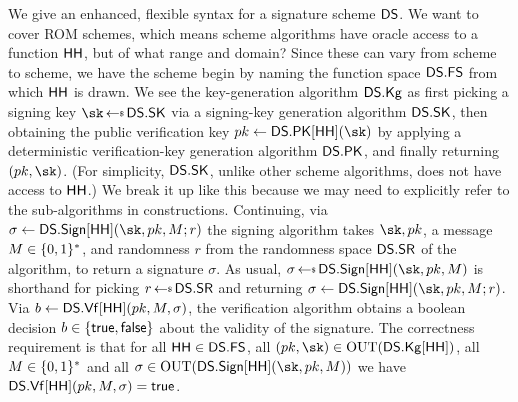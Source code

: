  We give an enhanced, flexible syntax for a signature scheme $\mathsf{DS}$. We want to cover ROM schemes, which means scheme algorithms have oracle access to a function $\mathsf{HH}$, but of what range and domain? Since these can vary from scheme to scheme, we have the scheme begin by naming the function space $\mathsf{DS}.\mathsf{FS}$ from which $\mathsf{HH}$ is drawn. We see the key-generation algorithm $\mathsf{DS}.\mathsf{Kg}$ as first picking a signing key $\sk\getsr\DS.\MakeSK$ via a signing-key generation algorithm $\mathsf{DS}.\mathsf{SK}$, then obtaining the public verification key $\pk \gets \DS.\MakePK[\HH](\sk)$ by applying a deterministic verification-key generation algorithm $\mathsf{DS}.\mathsf{PK}$, and finally returning $(\pk,\sk)$. (For simplicity, $\mathsf{DS}.\mathsf{SK}$, unlike other scheme algorithms, does not have access to $\mathsf{HH}$.) We break it up like this because we may need to explicitly refer to the sub-algorithms in constructions. Continuing, via $\sigma\gets \DS.\Sign[\HH](\sk,\pk,\msg;r)$ the signing algorithm takes $\sk,\pk$, a message ${M} \in \{0,1\}^*$, and randomness $r$ from the randomness space $\mathsf{DS}.\mathsf{SR}$ of the algorithm, to return a signature $\sigma$. As usual, $\sigma\getsr \DS.\Sign[\HH](\sk,\pk,\msg)$ is shorthand for picking $r\getsr\DS.\SigCoins$ and returning $\sigma\gets \DS.\Sign[\HH](\sk,\pk,\msg;r)$. Via $b\gets \mathsf{DS}.\mathsf{Vf}[\mathsf{HH}](pk,{M},\sigma)$, the verification algorithm obtains a boolean decision $b \in \{\mathsf{true}, \mathsf{false}\}$ about the validity of the signature. The correctness requirement is that for all $\mathsf{HH} \in \mathsf{DS}.\mathsf{FS}$, all $(\pk, \sk) \in \Outputs(\DS.\Kg[\HH])$, all ${M} \in \{0,1\}^*$ and all $\sigma\in \Outputs(\DS.\Sign[\HH](\sk,\pk,\msg))$ we have $\mathsf{DS}.\mathsf{Vf}[\mathsf{HH}](pk, {M}, \sigma) = \mathsf{true}$.





